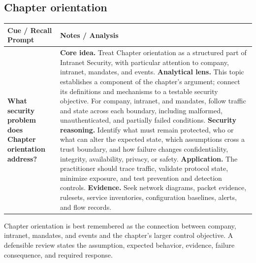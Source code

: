 \documentclass[11pt]{article}
\newcommand{\CornellHeader}{%
\rowcolor{Navy}\color{white}\bfseries Cue / Recall Prompt & \color{white}\bfseries Notes / Analysis\\\hline}
\newcommand{\CornellRow}[2]{%
\cellcolor{CueGray}\RaggedRight\textbf{#1} & \RaggedRight #2\\\hline}
\begin{document}
\subsection*{Chapter orientation}
\begin{longtable}{>{\RaggedRight\arraybackslash}p{}|>{\RaggedRight\arraybackslash}p{}}
\CornellHeader
\CornellRow{What security problem does Chapter orientation address?}{\textbf{Core idea.} Treat Chapter orientation as a structured part of Intranet Security, with particular attention to company, intranet, mandates, and events. \textbf{Analytical lens.} This topic establishes a component of the chapter's argument; connect its definitions and mechanisms to a testable security objective. For company, intranet, and mandates, follow traffic and state across each boundary, including malformed, unauthenticated, and partially failed conditions. \textbf{Security reasoning.} Identify what must remain protected, who or what can alter the expected state, which assumptions cross a trust boundary, and how failure changes confidentiality, integrity, availability, privacy, or safety. \textbf{Application.} The practitioner should trace traffic, validate protocol state, minimize exposure, and test prevention and detection controls. \textbf{Evidence.} Seek network diagrams, packet evidence, rulesets, service inventories, configuration baselines, alerts, and flow records.}
\end{longtable}
\begin{topicsummary}
Chapter orientation is best remembered as the connection between company, intranet, mandates, and events and the chapter's larger control objective. A defensible review states the assumption, expected behavior, evidence, failure consequence, and required response.
\end{topicsummary}
\end{document}
